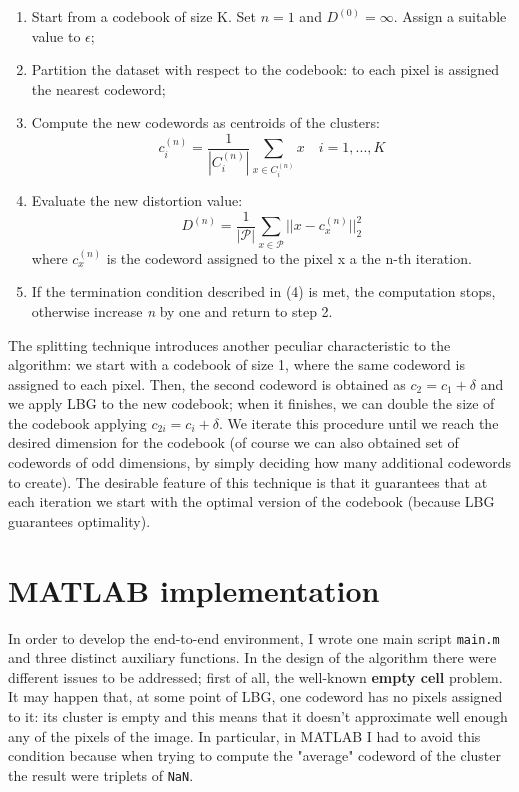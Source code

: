 \documentclass{report}
\def\code#1{\texttt{#1}}
\begin{document}
\begin{enumerate}
	\item Start from a codebook of size K. Set $n = 1$ and $ D^{(0)} = \infty $. Assign a suitable value to $\epsilon$; %
	\item Partition the dataset with respect to the codebook: to each pixel is assigned the nearest codeword;
	\item Compute the new codewords as centroids of the clusters:
	\begin{equation}
	c_i^{(n)} = \frac{1}{|C_i^{(n)}|} \sum_{x \in C_i^{(n)}} x \quad i = 1,...,K
	\end{equation}
	\item Evaluate the new distortion value:
	\begin{equation}
	D^{(n)} = \frac{1}{|\mathcal{P}|} \sum_{x \in \mathcal{P}} ||x - c_x^{(n)}||_2^2
	\end{equation}
	where $c_x^{(n)}$ is the codeword assigned to the pixel x a the n-th iteration.
	\item If the termination condition described in (4) is met, the computation stops, otherwise increase \textit{n} by one and return to step 2.
\end{enumerate}

The splitting technique introduces another peculiar characteristic to the algorithm: we start with a codebook of size 1, where the same codeword is assigned to each pixel. Then, the second codeword is obtained as $ c_2 = c_1 + \delta$ and we apply LBG to the new codebook; when it finishes, we can double the size of the codebook applying $c_{2i} = c_i + \delta$. We iterate this procedure until we reach the desired dimension for the codebook (of course we can also obtained set of codewords of odd dimensions, by simply deciding how many additional codewords to create). The desirable feature of this technique is that it guarantees that at each iteration we start with the optimal version of the codebook (because LBG guarantees optimality).

\section{MATLAB implementation}
In order to develop the end-to-end environment, I wrote one main script \code{main.m} and three distinct auxiliary functions. In the design of the algorithm there were different issues to be addressed; first of all, the well-known \textbf{empty cell} problem. It may happen that, at some point of LBG, one codeword has no pixels assigned to it: its cluster is empty and this means that it doesn't approximate well enough any of the pixels of the image. In particular, in MATLAB I had to avoid this condition because when trying to compute the "average" codeword of the cluster the result were triplets of \code{NaN}.
\end{document}
